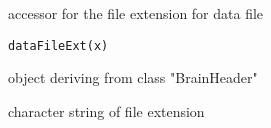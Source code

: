 \begin{Description}\relax
accessor for the file extension for data file \
\end{Description}
\begin{Usage}
\begin{verbatim}
dataFileExt(x)
\end{verbatim}
\end{Usage}
\begin{Arguments}
\begin{ldescription}
\item[\code{x}] object deriving from class "BrainHeader" 
\end{ldescription}
\end{Arguments}
\begin{Value}
character string of file extension
\end{Value}

